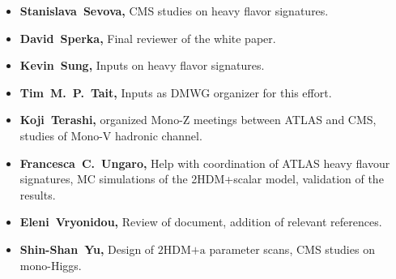 \documentclass[a4paper, 11pt,notoc]{article}
\newcommand{\hdma}{\ensuremath{\textrm{2HDM+a}}\xspace}
\begin{document}
\begin{itemize}
\item \textbf{Stanislava~Sevova,} CMS studies on heavy flavor signatures. 

\item \textbf{David~Sperka,}  Final reviewer of the white paper. 

\item \textbf{Kevin~Sung,} Inputs on heavy flavor signatures. 

\item \textbf{Tim~M.~P.~Tait,} Inputs as DMWG organizer for this effort. 

\item \textbf{Koji~Terashi,} organized Mono-Z meetings between ATLAS and CMS, studies of Mono-V hadronic channel. 

\item \textbf{Francesca~C.~Ungaro,} Help with coordination of ATLAS heavy flavour signatures, MC simulations of the 2HDM+scalar model, validation of the results. 

\item \textbf{Eleni~Vryonidou,} Review of document, addition of relevant references.

\item \textbf{Shin-Shan~Yu,} Design of \hdma parameter scans, CMS studies on mono-Higgs.

\end{itemize}
\end{document}
